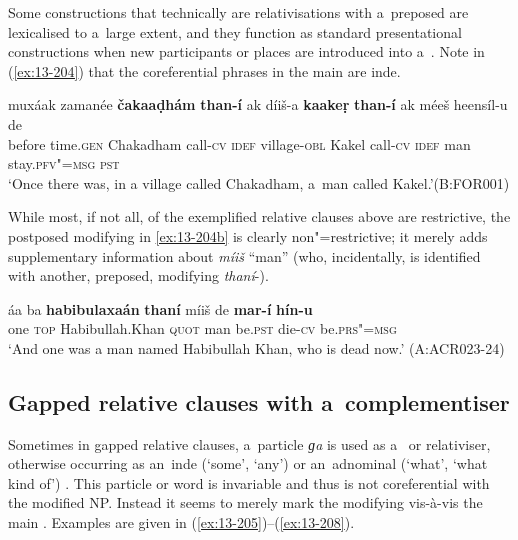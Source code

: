 Some constructions that technically are relativisations with a~preposed   are lexicalised to a~large extent, and they function as standard presentational constructions when new participants or places are introduced into a~. Note in (\ref{ex:13-204}) that the coreferential  phrases in the main  are inde.

\begin{exe}
\ex
\label{ex:13-204}
\gll muxáak zamanée \textbf{čakaaḍhám} \textbf{than-í} ak díiš-a \textbf{kaakeṛ} \textbf{than-í} ak méeš heensíl-u de\\
before time.\textsc{gen} Chakadham call-\textsc{cv} \textsc{idef} village-\textsc{obl}  Kakel call-\textsc{cv} \textsc{idef} man stay.\textsc{pfv"=msg} \textsc{pst}\\
\glt `Once there was, in a village called Chakadham, a~man called Kakel.'\newline (B:FOR001)
\end{exe}


While most, if not all, of the exemplified relative clauses above are restrictive, the postposed modifying   in \ref{ex:13-204b} is clearly non"=restrictive; it merely adds supplementary information about \textit{míiš} ``man'' (who, incidentally, is identified with another, preposed, modifying \textit
{thaní}-). 

\begin{exe}
\ex
\label{ex:13-204b}
\gll áa ba \textbf{habibulaxaán} \textbf{thaní} míiš de \textbf{mar-í} \textbf{hín-u}\\
one \textsc{top} Habibullah.Khan \textsc{quot} man be.\textsc{pst}   die-\textsc{cv} be.\textsc{prs"=msg}\\
\glt `And one was a man named Habibullah Khan, who is dead now.' (A:ACR023-24)
\end{exe}



\subsection{Gapped relative clauses with a~complementiser}
\label{subsec:13-6-4}


Sometimes in gapped relative clauses, a~particle \textit{ɡa} is used as a~ or relativiser, otherwise occurring as an~inde (`some', `any') or an~adnominal  (`what', `what kind of') . This particle or word is invariable and thus is not coreferential with the modified NP. Instead it seems to merely mark the modifying  vis-à-vis the main . Examples are given in (\ref{ex:13-205})--(\ref{ex:13-208}).


